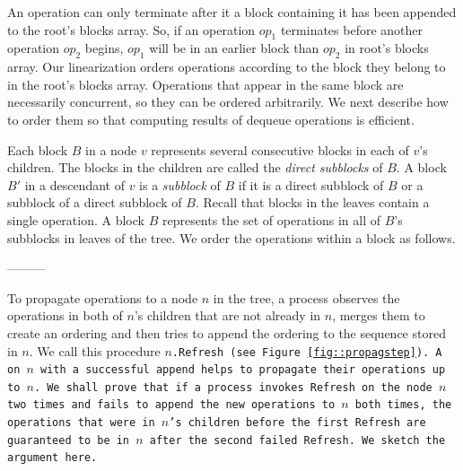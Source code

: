 An operation can only terminate after it a block containing it has been appended to the root's blocks array.
So, if an operation $op_1$ terminates before another operation $op_2$ begins, 
$op_1$ will be in an earlier block than $op_2$ in root's blocks array.
Our linearization orders operations according to the block they belong to in the root's blocks array.
Operations that appear in the same block are necessarily concurrent, so they can be ordered arbitrarily.
We next describe how to order them so that computing results of dequeue operations is efficient.

Each block $B$ in a node $v$ represents several consecutive blocks in each of $v$'s children.
The blocks in the children are called the \emph{direct subblocks} of $B$.
A block $B'$ in a descendant of $v$ is a \emph{subblock} of $B$ if it is a direct subblock of $B$
or a subblock of a direct subblock of $B$.
Recall that blocks in the leaves contain a single operation.
A block $B$ represents the set of operations in all of $B$'s subblocks in leaves of the tree.
We order the operations within a block as follows.




---------



To propagate operations to a node $n$ in the tree, a process observes
the operations in both of $n$'s children that are not already in $n$,
merges them to create an ordering and then tries to append the
ordering to the sequence stored in $n$. We call this procedure
\tt{$n$.Refresh} (see Figure \ref{fig::propagstep}). A  on
$n$ with a successful append helps to propagate their operations up to
$n$. We shall prove that if a process invokes \tt{Refresh} on the node
$n$ two times and fails to append the new operations to $n$ both
times, the operations that were in $n$'s children before the first
\tt{Refresh} are guaranteed to be in $n$ after the second failed
\tt{Refresh}. 
We sketch the argument here.

